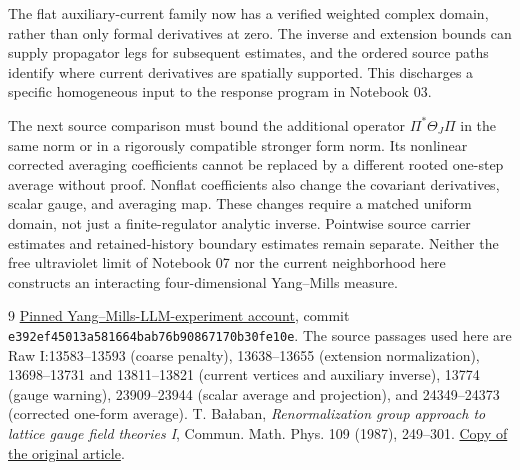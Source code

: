 \documentclass[11pt]{article}
\theoremstyle{remark}
\begin{document}
The flat auxiliary-current family now has a verified weighted
complex domain, rather than only formal derivatives at zero.
The inverse and extension bounds can supply propagator legs for
subsequent estimates, and the ordered source paths identify where
current derivatives are spatially supported. This discharges a
specific homogeneous input to the response program in Notebook 03.

The next source comparison must bound the additional operator
$\Pi^*\Theta_J\Pi$ in the same norm or in a rigorously compatible
stronger form norm. Its nonlinear corrected averaging coefficients
cannot be replaced by a different rooted one-step average without
proof. Nonflat coefficients also change the covariant derivatives,
scalar gauge, and averaging map. These changes require a matched
uniform domain, not just a finite-regulator analytic inverse.
Pointwise source carrier estimates and retained-history boundary
estimates remain separate. Neither the free ultraviolet limit of
Notebook 07 nor the current neighborhood here constructs an
interacting four-dimensional Yang--Mills measure.

\begin{thebibliography}{9}
\href{https://github.com/ethanwsussman/Yang--Mills-LLM-experiment/tree/e392ef45013a581664bab76b90867170b30fe10e}
{Pinned Yang--Mills-LLM-experiment account}, commit
\texttt{e392ef45013a581664bab76b90867170b30fe10e}.
The source passages used here are Raw I:13583--13593
(coarse penalty), 13638--13655 (extension normalization),
13698--13731 and 13811--13821 (current vertices and auxiliary inverse),
13774 (gauge warning), 23909--23944 (scalar average and projection),
and 24349--24373 (corrected one-form average).
 T. Ba\l aban,
\emph{Renormalization group approach to lattice gauge field theories I},
Commun. Math. Phys. 109 (1987), 249--301.
\href{https://scispace.com/pdf/renormalization-group-approach-to-lattice-gauge-field-3ygai0vxt1.pdf}
{Copy of the original article}.
\end{thebibliography}
\end{document}
